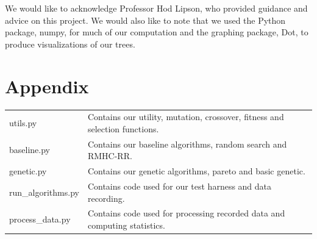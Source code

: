 \documentclass{acm_proc_article-sp}
\begin{document}
We would like to acknowledge Professor Hod Lipson, who provided guidance and advice on this project. We would also like to note that we used the Python package, numpy, for much of our computation and the graphing package, Dot, to produce visualizations of our trees.

\section{Appendix}

\begin{tabular}{|l|l|}
\hline
utils.py & Contains our utility, mutation, crossover, fitness and selection functions. \\
baseline.py & Contains our baseline algorithms, random search and RMHC-RR. \\
genetic.py & Contains our genetic algorithms, pareto and basic genetic. \\
run\_algorithms.py & Contains code used for our test harness and data recording. \\
process\_data.py & Contains code used for processing recorded data and computing statistics. \\ \hline
\end{tabular}

%

%
%
\balancecolumns
\end{document}
